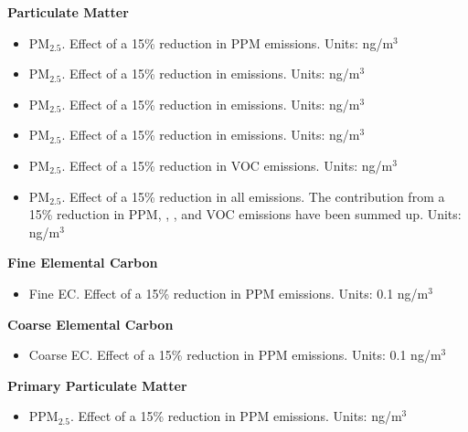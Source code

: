 \textbf{Particulate Matter}
\begin{itemize}
\item PM$_{2.5}$. Effect of a 15\% reduction in PPM emissions. Units: ng/m$^3$ 
\item PM$_{2.5}$. Effect of a 15\% reduction in \sox emissions. Units: ng/m$^3$
\item PM$_{2.5}$. Effect of a 15\% reduction in \nox emissions. Units: ng/m$^3$
\item PM$_{2.5}$. Effect of a 15\% reduction in \nhiii emissions. Units: ng/m$^3$
\item PM$_{2.5}$. Effect of a 15\% reduction in VOC emissions. Units: ng/m$^3$ 
\item PM$_{2.5}$. Effect of a 15\% reduction in all emissions. The
contribution from a 15\% reduction in PPM, \sox, \nox, \nhiii and
VOC emissions have been summed up. Units: ng/m$^3$
\end{itemize}
\vspace{20pt}

\textbf{Fine Elemental Carbon}
\begin{itemize}
\item Fine EC. Effect of a 15\% reduction in PPM emissions. Units: 0.1
  ng/m$^3$
\end{itemize}
\vspace{20pt}

\textbf{Coarse Elemental Carbon}
\begin{itemize}
\item Coarse EC. Effect of a 15\% reduction in PPM emissions. Units:
  0.1 ng/m$^3$
\end{itemize}
\vspace{20pt}

\textbf{Primary Particulate Matter}
\begin{itemize}
\item PPM$_{2.5}$. Effect of a 15\% reduction in PPM emissions. Units: ng/m$^3$
\end{itemize}
\vspace{20pt}
  


